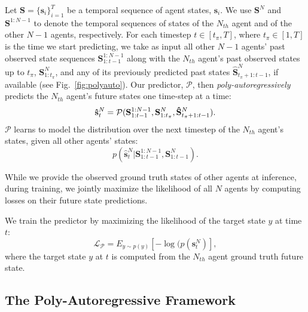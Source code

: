 Let $\mathbf{S}=\{\mathbf{s}_i\}_{i=1}^T$ be a temporal sequence of agent states, $\mathbf{s}_i$.
We use $\mathbf{S}^N$ and $\mathbf{S}^{1:N-1}$ to denote the temporal sequences of states of the $N_{th}$ agent and of the other $N-1$ agents, respectively.
For each timestep $t \in [t_\pi,T]$, where $t_\pi \in [1,T]$ is the time we start predicting,
we take as input all other $N-1$ agents' past observed state sequences
$\mathbf{S}^{1:N-1}_{1:t-1}$
along with the $N_{th}$ agent's
past observed states up to $t_\pi$, 
$\mathbf{{S}}^N_{1:t_\pi}$,
and any of its previously predicted past states $\mathbf{\hat{S}}^N_{t_{\pi}+1:t-1}$,
if available (see Fig.~\ref{fig:polyauto}).
Our predictor, $\mathcal{P}$, then \textit{poly-autoregressively} predicts the $N_{th}$ agent's future states one time-step at a time:
\begin{equation}
       \mathbf{\hat{s}}^N_{t} = \mathcal{P}(\mathbf{S}^{1:N-1}_{1:t-1}, \mathbf{{S}}^N_{1:t_{\pi}},\mathbf{\hat{S}}^N_{t_\pi+1:t-1}). \\
\end{equation}
$\mathcal{P}$ learns to model the distribution over the next timestep of the $N_{th}$ agent's states, given all other agents' states:
\begin{equation}
p(\mathbf{\hat{s}}^N_{t} | \mathbf{S}^{1:N-1}_{1:t-1}, \mathbf{S}^N_{1:t-1}).
\end{equation}

While we provide the observed ground truth states of other agents at inference, during training, we jointly maximize the likelihood of all $N$ agents by computing losses on their future state predictions.

We train the predictor by maximizing the likelihood of the target state $y$ at time $t$:
\begin{equation*}
\label{eq:transformerloss}
    \mathscr{L_\mathcal{P}} = E_{y \sim p(y)}[-\log(p(\mathbf{s}^N_{t})],
\end{equation*}
where the target state $y$ at $t$ is computed from the $N_{th}$ agent ground truth future state.

\subsection{The Poly-Autoregressive Framework}
\label{sec:framework}

